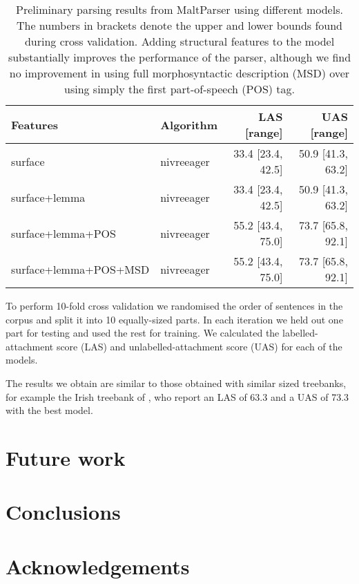 \documentclass[a4paper,11pt, onecolumn,twoside]{article}
\begin{document}

\begin{table}[htbp]
	\centering
	\begin{tabular}{llrr}
		\toprule
			\textbf{Features}       & \textbf{Algorithm} &\textbf{LAS} [range] & \textbf{UAS} [range] \\
		\midrule
			surface                & nivreeager  & 33.4 [23.4, 42.5] & 50.9 [41.3, 63.2] \\
			surface+lemma          & nivreeager  & 33.4 [23.4, 42.5] & 50.9 [41.3, 63.2] \\
			surface+lemma+POS      & nivreeager  & 55.2 [43.4, 75.0] & 73.7 [65.8, 92.1] \\
			surface+lemma+POS+MSD  & nivreeager  & 55.2 [43.4, 75.0] & 73.7 [65.8, 92.1] \\
		\bottomrule
	\end{tabular}
	\caption{Preliminary parsing results from MaltParser using different models. The numbers in brackets denote the upper and lower bounds found during cross validation. Adding structural features to the model substantially improves the performance of the parser, although we find no improvement in using full morphosyntactic description (MSD) over using simply the first part-of-speech (POS) tag.}
	\label{table:eval}
\end{table}

To perform 10-fold cross validation we randomised the order of sentences in the corpus
and split it into 10 equally-sized parts. In each iteration we held out one part for testing and used
the rest for training. We calculated the labelled-attachment score (LAS) and 
unlabelled-attachment score (UAS) for each of the models.

The results we obtain are similar to those obtained with similar 
sized treebanks, for example the Irish treebank of \textcite{Lynn12}, who report an LAS of
63.3 and a UAS of 73.3 with the best model.


\section{Future work}




\section{Conclusions}

\section*{Acknowledgements}


%
%
\printbibliography
\end{document}
